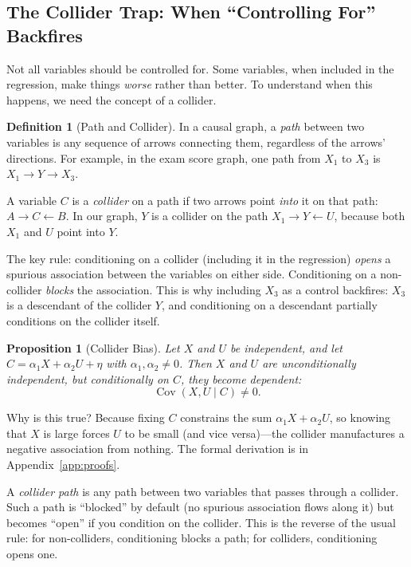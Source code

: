 \documentclass[11pt,a4paper]{article}
\theoremstyle{definition}
\newtheorem{definition}{Definition}[section]
\theoremstyle{plain}
\newtheorem{proposition}{Proposition}[section]
\theoremstyle{remark}
\newcommand{\Cov}{\operatorname{Cov}}
\begin{document}
\subsection{The Collider Trap: When ``Controlling For'' Backfires}

Not all variables should be controlled for. Some variables, when included in the regression, make things \emph{worse} rather than better. To understand when this happens, we need the concept of a collider.

\begin{definition}[Path and Collider]
In a causal graph, a \emph{path} between two variables is any sequence of arrows connecting them, regardless of the arrows' directions. For example, in the exam score graph, one path from $X_1$ to $X_3$ is $X_1 \to Y \to X_3$.

A variable $C$ is a \emph{collider} on a path if two arrows point \emph{into} it on that path: $A \to C \leftarrow B$. In our graph, $Y$ is a collider on the path $X_1 \to Y \leftarrow U$, because both $X_1$ and $U$ point into $Y$.

The key rule: conditioning on a collider (including it in the regression) \emph{opens} a spurious association between the variables on either side. Conditioning on a non-collider \emph{blocks} the association. This is why including $X_3$ as a control backfires: $X_3$ is a descendant of the collider $Y$, and conditioning on a descendant partially conditions on the collider itself.
\end{definition}

\begin{proposition}[Collider Bias]\label{prop:collider}
Let $X$ and $U$ be independent, and let $C = \alpha_1 X + \alpha_2 U + \eta$ with $\alpha_1, \alpha_2 \neq 0$. Then $X$ and $U$ are unconditionally independent, but conditionally on $C$, they become dependent:
\[
  \Cov(X, U \mid C) \neq 0.
\]
\end{proposition}

Why is this true? Because fixing $C$ constrains the sum $\alpha_1 X + \alpha_2 U$, so knowing that $X$ is large forces $U$ to be small (and vice versa)---the collider manufactures a negative association from nothing. The formal derivation is in Appendix~\ref{app:proofs}.

A \emph{collider path} is any path between two variables that passes through a collider. Such a path is ``blocked'' by default (no spurious association flows along it) but becomes ``open'' if you condition on the collider. This is the reverse of the usual rule: for non-colliders, conditioning blocks a path; for colliders, conditioning opens one.
\end{document}

